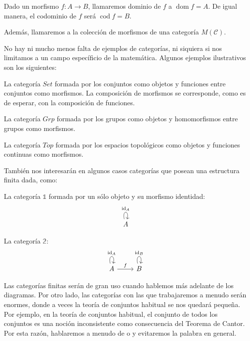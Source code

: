 \documentclass[12pt, twoside]{book}
\newcommand{\cat}{{\mathcal{C}}}
\newcommand{\Set}{{Set}}
\newcommand{\Grp}{{Grp}}
\newcommand{\Top}{{Top}}
\DeclareMathOperator{\dom}{dom}
\DeclareMathOperator{\cod}{cod}
\DeclareMathOperator{\id}{id}
\begin{document}
Dado un morfismo $f \colon A \to B$, llamaremos dominio de $f$ a $\dom f = A$.
De igual manera, el codominio de $f$ será $\cod f = B$.

Además, llamaremos a la colección de morfismos de una categoría $M(\cat)$.

No hay ni mucho menos falta de ejemplos de categorías, ni siquiera si nos limitamos a un campo específicio de la matemática.
Algunos ejemplos ilustrativos son los siguientes:

\begin{example}
La categoría $\Set$ formada por los conjuntos como objetos y funciones entre conjuntos como morfismos.
La composición de morfismos se corresponde, como es de esperar, con la composición de funciones.
\end{example}

\begin{example}
La categoría $\Grp$ formada por los grupos como objetos y homomorfismos entre grupos como morfismos.
\end{example}

\begin{example}
La categoría $\Top$ formada por los espacios topológicos como objetos y funciones continuas como morfismos.
\end{example}

También nos interesarán en algunos casos categorías que posean una estructura finita dada, como:
\begin{example}
La categoría $\mathbb{1}$ formada por un sólo objeto y su morfismo identidad:
\[ \begin{tikzcd}
A \arrow[loop above,"\id_A"]
\end{tikzcd}\]
\end{example}

\begin{example}
La categoría $\mathbb{2}$:
\[ \begin{tikzcd}
A \arrow[loop above,"\id_A"] \arrow[r,"f"] & B \arrow[loop above,"\id_B"]
\end{tikzcd}\]
\end{example}

Las categorías finitas serán de gran uso cuando hablemos más adelante de los diagramas.
Por otro lado, las categorías con las que trabajaremos a menudo serán enormes, donde a veces la teoría de conjuntos habitual se nos quedará pequeña.
Por ejemplo, en la teoría de conjuntos habitual, el conjunto de todos los conjuntos es una noción inconsistente como consecuencia del Teorema de Cantor.
Por esta razón, hablaremos a menudo de  o  y evitaremos la palabra  en general.
\end{document}
